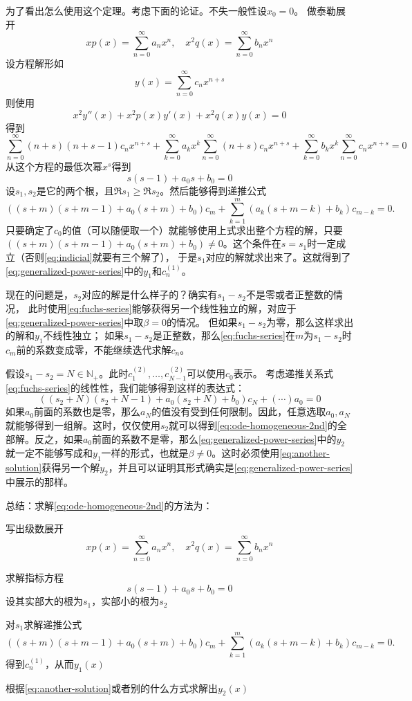 \documentclass[UTF8]{ctexart}
\newcommand*{\natnums}{\mathbb{N}}
\newcommand*{\taylor}[1]{\sum_{#1 = 0}^\infty}
\renewenvironment{enumerate}{\begin{compactenum}}{\end{compactenum}}
\begin{document}
为了看出怎么使用这个定理。考虑下面的论证。不失一般性设$x_0=0$。
做泰勒展开
\[
    xp(x) = \taylor{n} a_n x^n, \quad x^2 q(x) = \taylor{n} b_n x^n
\]
设方程解形如
\[
    y(x) = \taylor{n} c_n x^{n+s}
\]
则使用
\[
    x^2 y''(x) + x^2 p(x) y'(x) + x^2 q(x) y(x) = 0
\]
得到
\begin{equation}
    \taylor{n} (n+s)(n+s-1)c_n x^{n+s} + \taylor{k} a_k x^k \taylor{n} (n+s) c_n x^{n+s} + 
    \taylor{k} b_k x^k \taylor{n} c_n x^{n+s} = 0
\end{equation}
从这个方程的最低次幂$x^s$得到
\begin{equation}
    s(s-1) + a_0 s + b_0 = 0
    \label{eq:indicial}
\end{equation}
设$s_1, s_2$是它的两个根，且$\Re s_1 \geq \Re s_2$。然后能够得到递推公式
\begin{equation}
    ((s+m)(s+m-1) + a_0(s+m) + b_0) c_m + \sum_{k=1}^m (a_k (s + m - k) + b_k) c_{m-k} = 0.
    \label{eq:fuchs-series}
\end{equation}
只要确定了$c_0$的值（可以随便取一个）就能够使用上式求出整个方程的解，只要
$((s+m)(s+m-1) + a_0(s+m) + b_0) \neq 0$。这个条件在$s=s_1$时一定成立（否则\eqref{eq:indicial}就要有三个解了），
于是$s_1$对应的解就求出来了。这就得到了\eqref{eq:generalized-power-series}中的$y_1$和$c^{(1)}_n$。

现在的问题是，$s_2$对应的解是什么样子的？确实有$s_1 - s_2$不是零或者正整数的情况，
此时使用\eqref{eq:fuchs-series}能够获得另一个线性独立的解，对应于\eqref{eq:generalized-power-series}中取$\beta=0$的情况。
但如果$s_1 - s_2$为零，那么这样求出的解和$y_1$不线性独立；
如果$s_1 - s_2$是正整数，那么\eqref{eq:fuchs-series}在$m$为$s_1 - s_2$时$c_m$前的系数变成零，不能继续迭代求解$c_n$。

假设$s_1 - s_2 = N \in \natnums_+$。此时$c^{(2)}_{1}, \ldots, c^{(2)}_{N-1}$可以使用$c_0$表示。
考虑递推关系式\eqref{eq:fuchs-series}的线性性，我们能够得到这样的表达式：
\[
    ((s_2 + N)(s_2 + N - 1) + a_0 (s_2 + N) + b_0) c_N + (\cdots) a_0 = 0
\]
如果$a_0$前面的系数也是零，那么$a_N$的值没有受到任何限制。因此，任意选取$a_0, a_N$就能够得到一组解。这时，仅仅使用$s_2$就可以得到\eqref{eq:ode-homogeneous-2nd}的全部解。反之，如果$a_0$前面的系数不是零，那么\eqref{eq:generalized-power-series}中的$y_2$就一定不能够写成和$y_1$一样的形式，也就是$\beta \neq 0$。这时必须使用\eqref{eq:another-solution}获得另一个解$y_2$，并且可以证明其形式确实是\eqref{eq:generalized-power-series}中展示的那样。

总结：求解\eqref{eq:ode-homogeneous-2nd}的方法为：
\begin{enumerate}
    \item 写出级数展开
    \[
        xp(x) = \taylor{n} a_n x^n, \quad x^2 q(x) = \taylor{n} b_n x^n
    \]
    \item 求解指标方程
    \[
        s(s-1) + a_0 s + b_0 = 0
    \]
    设其实部大的根为$s_1$，实部小的根为$s_2$
    \item 对$s_1$求解递推公式
    \[
        ((s+m)(s+m-1) + a_0(s+m) + b_0) c_m + \sum_{k=1}^m (a_k (s + m - k) + b_k) c_{m-k} = 0.
    \]
    得到$c^{(1)}_n$，从而$y_1(x)$
    \item 根据\eqref{eq:another-solution}或者别的什么方式求解出$y_2(x)$
\end{enumerate}
\end{document}
